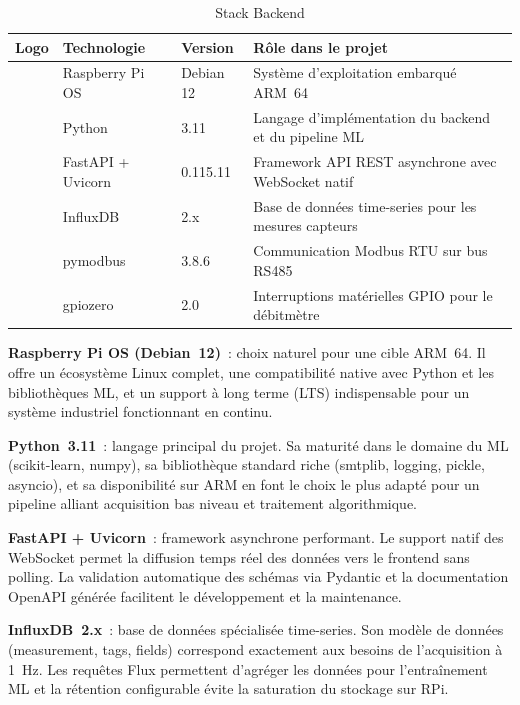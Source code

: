 \begin{table}[htbp]
\centering
\caption{Stack Backend}
\label{tab:stack_backend}
\begin{tabular}{c p{} p{} p{}}
\toprule
\textbf{Logo} & \textbf{Technologie} & \textbf{Version} & \textbf{Rôle dans le projet} \\
\midrule
\fbox{\parbox[c][0.6cm][c]{0.6cm}{\centering\tiny [RPi]}} & Raspberry Pi OS & Debian 12 & Système d'exploitation embarqué ARM~64 \\
\fbox{\parbox[c][0.6cm][c]{0.6cm}{\centering\tiny [Py]}} & Python & 3.11 & Langage d'implémentation du backend et du pipeline ML \\
\fbox{\parbox[c][0.6cm][c]{0.6cm}{\centering\tiny [FA]}} & FastAPI + Uvicorn & 0.115.11 & Framework API REST asynchrone avec WebSocket natif \\
\fbox{\parbox[c][0.6cm][c]{0.6cm}{\centering\tiny [In]}} & InfluxDB & 2.x & Base de données time-series pour les mesures capteurs \\
\fbox{\parbox[c][0.6cm][c]{0.6cm}{\centering\tiny [pM]}} & pymodbus & 3.8.6 & Communication Modbus RTU sur bus RS485 \\
\fbox{\parbox[c][0.6cm][c]{0.6cm}{\centering\tiny [gp]}} & gpiozero & 2.0 & Interruptions matérielles GPIO pour le débitmètre \\
\bottomrule
\end{tabular}
\end{table}

\textbf{Raspberry Pi OS (Debian~12)}~: choix naturel pour une cible ARM~64. Il offre un écosystème Linux complet, une compatibilité native avec Python et les bibliothèques ML, et un support à long terme (LTS) indispensable pour un système industriel fonctionnant en continu.

\textbf{Python~3.11}~: langage principal du projet. Sa maturité dans le domaine du ML (scikit-learn, numpy), sa bibliothèque standard riche (smtplib, logging, pickle, asyncio), et sa disponibilité sur ARM en font le choix le plus adapté pour un pipeline alliant acquisition bas niveau et traitement algorithmique.

\textbf{FastAPI + Uvicorn}~: framework asynchrone performant. Le support natif des WebSocket permet la diffusion temps réel des données vers le frontend sans polling. La validation automatique des schémas via Pydantic et la documentation OpenAPI générée facilitent le développement et la maintenance.

\textbf{InfluxDB~2.x}~: base de données spécialisée time-series. Son modèle de données (measurement, tags, fields) correspond exactement aux besoins de l'acquisition à 1~Hz. Les requêtes Flux permettent d'agréger les données pour l'entraînement ML et la rétention configurable évite la saturation du stockage sur RPi.

